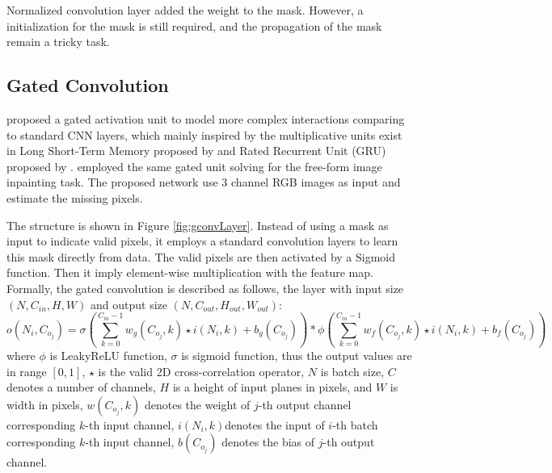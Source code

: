 Normalized convolution layer added the weight to the mask. However, a initialization for the mask is still required, and the propagation of the mask remain a tricky task. 

\subsection{Gated Convolution}

\cite{gated_activation} proposed a gated activation unit to model more complex interactions comparing to standard CNN layers, which mainly inspired by the multiplicative units exist in Long Short-Term Memory proposed by \cite{lstm} and Rated Recurrent Unit (GRU) proposed by \cite{gru}. 
\cite{gconv} employed the same gated unit solving for the free-form image inpainting task. The proposed network use 3 channel RGB images as input and estimate the missing pixels. 


The structure is shown in Figure \ref{fig:gconvLayer}. Instead of using a mask as input to indicate valid pixels, it employs a standard convolution layers to learn this mask directly from data. The valid pixels are then activated by a Sigmoid function. Then it imply element-wise multiplication with the feature map. Formally, the gated convolution is described as follows, the layer with input size $ (N, C_{in}, H, W) $ and output size $ (N, C_{out}, H_{out}, W_{out}) $:
\begin{equation}\label{gconv}
	o(N_i, C_{o_j}) = \sigma(\sum_{k=0}^{C_{in}-1}w_g(C_{o_j}, k) \star i(N_i,k) + b_g(C_{o_j})) * 
	\phi (\sum_{k=0}^{C_{in}-1}w_f(C_{o_j}, k) \star i(N_i,k) + b_f(C_{o_j}))
\end{equation}
where $ \phi $ is LeakyReLU function, $ \sigma $ is sigmoid function, thus the output values are in range $ [0,1] $, $ \star $ is the valid 2D cross-correlation operator, $ N $ is batch size, $ C $ denotes a number of channels, $ H $ is a height of input planes in pixels, and $ W $ is width in pixels, $ w(C_{o_j},k) $ denotes the weight of $ j $-th output channel corresponding $ k $-th input channel, $ i(N_i, k) $denotes the input of $ i $-th batch corresponding $ k $-th input channel, $ b(C_{o_j}) $ denotes the bias of $ j $-th output channel.


